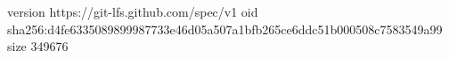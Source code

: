 version https://git-lfs.github.com/spec/v1
oid sha256:d4fe6335089899987733e46d05a507a1bfb265ce6ddc51b000508c7583549a99
size 349676
